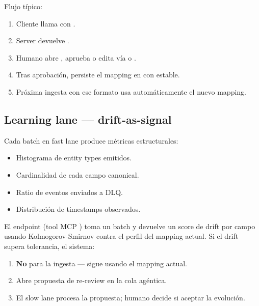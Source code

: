 Flujo típico:

\begin{enumerate}
    \item Cliente llama  con
    .
    \item Server devuelve .
    \item Humano abre , aprueba o edita
    vía  o .
    \item Tras aprobación,  persiste el
    mapping en  con
     estable.
    \item Próxima ingesta con ese formato usa automáticamente el
    nuevo mapping.
\end{enumerate}

\subsection{Learning lane — drift-as-signal}

Cada batch en fast lane produce métricas estructurales:

\begin{itemize}
    \item Histograma de entity types emitidos.
    \item Cardinalidad de cada campo canonical.
    \item Ratio de eventos enviados a DLQ.
    \item Distribución de timestamps observados.
\end{itemize}

El endpoint  (tool MCP
) toma un batch y devuelve un score de
drift por campo usando Kolmogorov-Smirnov contra el perfil del
mapping actual. Si el drift supera tolerancia, el sistema:

\begin{enumerate}
    \item \textbf{No} para la ingesta — sigue usando el mapping
    actual.
    \item Abre propuesta de re-review en la cola agéntica.
    \item El slow lane procesa la propuesta; humano decide si
    aceptar la evolución.
\end{enumerate}

